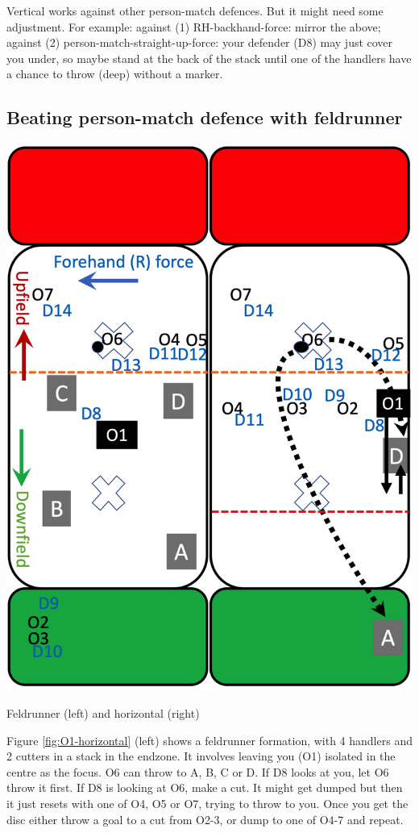 \documentclass{tufte-handout}
\begin{document}
Vertical works
against other person-match defences. 
But it might need 
some adjustment.
For example:
against (1) RH-backhand-force: mirror the above;
against (2) person-match-straight-up-force:  
your defender (D8) 
may just cover you under,  
so maybe
stand at the back of the stack
until one of the handlers 
have a chance to throw 
(deep)
without a marker.


\subsection{Beating person-match defence with feldrunner}
\label{sec:feld}
\begin{marginfigure}%
  \includegraphics[width=\linewidth]{O1-horizontal}
  \caption{Feldrunner (left) and horizontal (right)}
  \label{fig:O1-horizontal}
\end{marginfigure}

Figure \ref{fig:O1-horizontal} (left) 
shows a feldrunner formation, 
with 4 handlers
and 2 cutters
in a
stack in the endzone.
It involves 
leaving you 
(O1) 
isolated 
in the centre
as the focus. 
O6 can throw 
to A,
B, 
C 
or D. 
If D8 looks at you, 
let O6 throw it first. 
If D8 is 
looking at O6, 
make a cut. 
It might get dumped 
but then it just resets with 
one of O4, O5 or O7, 
trying to throw to you.
Once you get the disc 
either throw a goal 
to a cut 
from O2-3, 
or dump to 
one of O4-7 
and repeat. 
\end{document}
